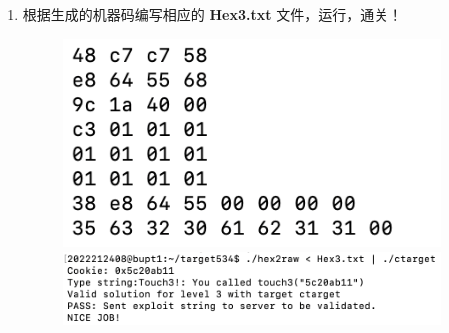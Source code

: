 \begin{enumerate}
\begin{figure}[htbp]
                \end{figure}
            \item 根据生成的机器码编写相应的 \textbf{Hex3.txt} 文件，运行，通关！
                \begin{figure}[htbp]
                    \includegraphics*[width = 10cm]{s3_7.png} \\
                    \includegraphics*[width = 10cm]{s3_8.png}
                \end{figure}
        \end{enumerate}


